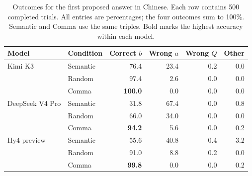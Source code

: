 \begin{table}[!t]
\centering
\small
\setlength{\tabcolsep}{7pt}
\renewcommand{\arraystretch}{1.12}
\caption{Outcomes for the first proposed answer in Chinese. Each row contains 500 completed
trials. All entries are percentages; the four outcomes sum to 100\%.
Semantic and Comma use the same triples. Bold marks the highest accuracy
within each model.}
\label{tab:strict-results-zh}
\begin{tabular}{@{}llrrrr@{}}
\toprule
Model & Condition & Correct $b$ & Wrong $a$ & Wrong $Q$ & Other \\
\midrule
Kimi K3 & Semantic & 76.4 & 23.4 & 0.2 & 0.0 \\
 & Random & 97.4 & 2.6 & 0.0 & 0.0 \\
 & Comma & \textbf{100.0} & 0.0 & 0.0 & 0.0 \\
\midrule
DeepSeek V4 Pro & Semantic & 31.8 & 67.4 & 0.0 & 0.8 \\
 & Random & 66.0 & 34.0 & 0.0 & 0.0 \\
 & Comma & \textbf{94.2} & 5.6 & 0.0 & 0.2 \\
\midrule
Hy4 preview & Semantic & 55.6 & 40.8 & 0.4 & 3.2 \\
 & Random & 91.0 & 8.8 & 0.2 & 0.0 \\
 & Comma & \textbf{99.8} & 0.0 & 0.0 & 0.2 \\
\bottomrule
\end{tabular}
\end{table}
